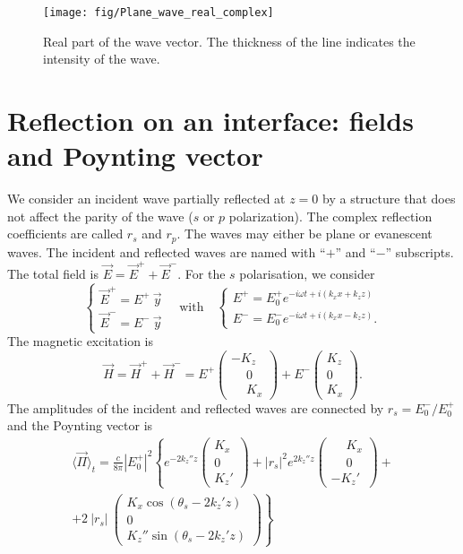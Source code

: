 \begin{figure}[h!]
\texttt{[image: fig/Plane\_wave\_real\_complex]}
\caption{\label{fig:Plane_wave_real_complex}Real part of the wave vector. The thickness of the line indicates the intensity of the wave.}
\end{figure}


\section{Reflection on an interface: fields and Poynting vector}

We consider an incident wave partially reflected at $z=0$ by a structure that does not affect the parity of the wave ($s$ or $p$ polarization).
The complex reflection coefficients are called $r_s$ and $r_p$.
The waves may either be plane or evanescent waves.
The incident and reflected waves are named with ``$+$'' and ``$-$'' subscripts.
The total field is $\vec E = \vec E^+ + \vec E^-$.
%
For the $s$ polarisation, we consider
$$
\left\{
\begin{array}{l}
\vec E^+ = E^+\ \vec y \\
\vec E^- = E^-\ \vec y
\end{array}
\right.
\quad\mathrm{with}\quad
\left\{
\begin{array}{l}
E^+ = E_0^+ e^{-i\omega t + i(k_x x + k_z z)}  \\
E^- = E_0^- e^{-i\omega t + i(k_x x - k_z z)}.
\end{array}
\right.
$$
The magnetic excitation is 
$$
\vec H = \vec H^+ + \vec H^- = 
E^+ 
\begin{pmatrix}
- K_z \\
\phantom{-} 0 \\
\phantom{-} K_x 
\end{pmatrix}
+
E^-
\begin{pmatrix}
K_z \\
0 \\
K_x 
\end{pmatrix}.
$$
The amplitudes of the incident and reflected waves are connected by $r_s = E_0^- / E_0^+$ and the Poynting vector is
\begin{align*}
\langle \vec{\Pi} \rangle_t = 
\frac{c}{8\pi} |E_0^+|^2 \left\{
e^{-2 k_z'' z} 
\begin{pmatrix}
K_x \\
0 \\
K_z'
\end{pmatrix}
+ 
|r_s|^2
e^{2 k_z'' z}
\begin{pmatrix}
\phantom{-} K_x \\
\phantom{-} 0 \\
-K_z'
\end{pmatrix}
+ \right.\\
\left. +
2\ |r_s|\ 
\begin{pmatrix}
K_x \cos(\theta_{s} - 2 k_z' z)\\
0 \\
K_z'' \sin(\theta_{s} - 2 k_z' z)
\end{pmatrix}
\right\}
\end{align*}
